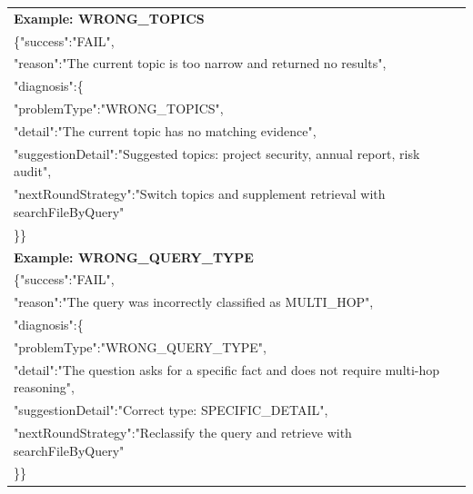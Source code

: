 {\begin{longtable}{@{}p{}@{}}
\textbf{Example: WRONG\_TOPICS}
\\

{\ttfamily
\{"success":"FAIL",
}
\\

{\ttfamily
"reason":"The current topic is too narrow and returned no results",
}
\\

{\ttfamily
"diagnosis":\{
}
\\

{\ttfamily
"problemType":"WRONG\_TOPICS",
}
\\

{\ttfamily
"detail":"The current topic has no matching evidence",
}
\\

{\ttfamily
"suggestionDetail":"Suggested topics: project security, annual report, risk audit",
}
\\

{\ttfamily
"nextRoundStrategy":"Switch topics and supplement retrieval with searchFileByQuery"
}
\\

{\ttfamily
\}\}
}
\\



\textbf{Example: WRONG\_QUERY\_TYPE}
\\

{\ttfamily
\{"success":"FAIL",
}
\\

{\ttfamily
"reason":"The query was incorrectly classified as MULTI\_HOP",
}
\\

{\ttfamily
"diagnosis":\{
}
\\

{\ttfamily
"problemType":"WRONG\_QUERY\_TYPE",
}
\\

{\ttfamily
"detail":"The question asks for a specific fact and does not require multi-hop reasoning",
}
\\

{\ttfamily
"suggestionDetail":"Correct type: SPECIFIC\_DETAIL",
}
\\

{\ttfamily
"nextRoundStrategy":"Reclassify the query and retrieve with searchFileByQuery"
}
\\

{\ttfamily
\}\}
}
\\



\end{longtable}}
